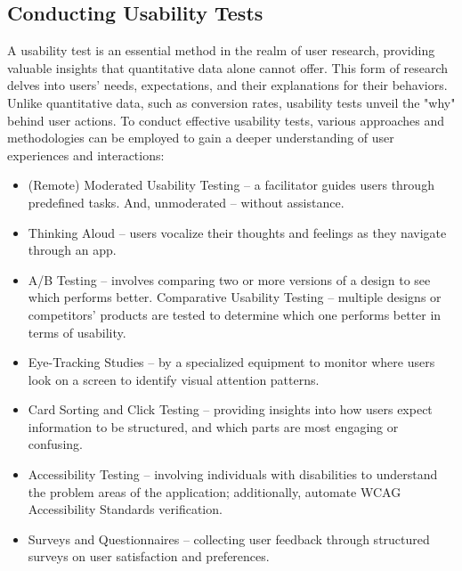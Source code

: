 
\subsection{Conducting Usability Tests} \label{usability}

A usability test is an essential method in the realm of user research, providing valuable insights that quantitative 
data alone cannot offer. This form of research delves into users' needs, expectations, and their explanations for 
their behaviors. Unlike quantitative data, such as conversion rates, usability tests unveil the "why" behind user 
actions. To conduct effective usability tests, various approaches and methodologies can be employed to gain a deeper 
understanding of user experiences and interactions:

\begin{itemize}
  \item (Remote) Moderated Usability Testing -- a facilitator guides users through predefined tasks. And, unmoderated 
  -- without assistance.

  \item Thinking Aloud -- users vocalize their thoughts and feelings as they navigate through an app.

  \item A/B Testing -- involves comparing two or more versions of a design to see which performs better. 
  Comparative Usability Testing -- multiple designs or competitors' products are tested to determine which one 
  performs better in terms of usability.

  \item Eye-Tracking Studies -- by a specialized equipment to monitor where users look on a screen to identify visual 
  attention patterns.

  \item Card Sorting and Click Testing -- providing insights into how users expect information to be structured, and 
  which parts are most engaging or confusing.

  \item Accessibility Testing -- involving individuals with disabilities to understand the problem areas of the 
  application; additionally, automate WCAG Accessibility Standards verification.

  \item Surveys and Questionnaires -- collecting user feedback through structured surveys on user satisfaction and 
  preferences.
\end{itemize}
